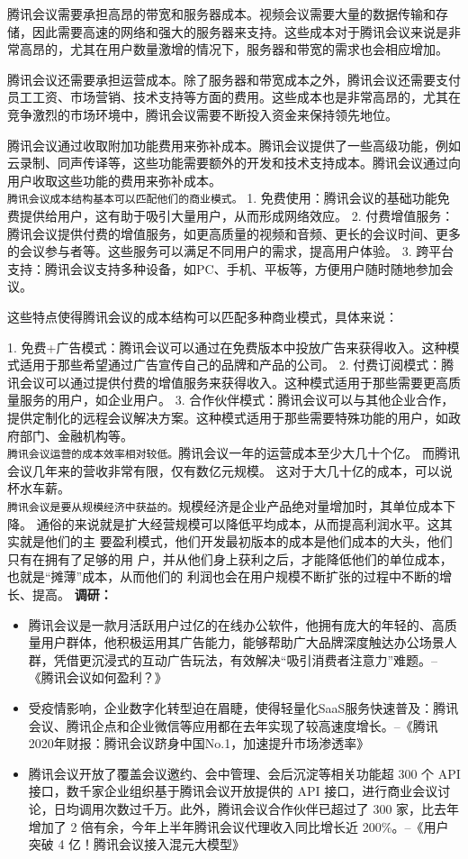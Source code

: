 \documentclass[a4paper,12pt]{article}
\begin{document}
腾讯会议需要承担高昂的带宽和服务器成本。视频会议需要大量的数据传输和存储，因此需要高速的网络和强大的服务器来支持。这些成本对于腾讯会议来说是非常高昂的，尤其在用户数量激增的情况下，服务器和带宽的需求也会相应增加。

腾讯会议还需要承担运营成本。除了服务器和带宽成本之外，腾讯会议还需要支付员工工资、市场营销、技术支持等方面的费用。这些成本也是非常高昂的，尤其在竞争激烈的市场环境中，腾讯会议需要不断投入资金来保持领先地位。

腾讯会议通过收取附加功能费用来弥补成本。腾讯会议提供了一些高级功能，例如云录制、同声传译等，这些功能需要额外的开发和技术支持成本。腾讯会议通过向用户收取这些功能的费用来弥补成本。
\\
\texttt{腾讯会议成本结构基本可以匹配他们的商业模式。}
1. 免费使用：腾讯会议的基础功能免费提供给用户，这有助于吸引大量用户，从而形成网络效应。
2. 付费增值服务：腾讯会议提供付费的增值服务，如更高质量的视频和音频、更长的会议时间、更多的会议参与者等。这些服务可以满足不同用户的需求，提高用户体验。
3. 跨平台支持：腾讯会议支持多种设备，如PC、手机、平板等，方便用户随时随地参加会议。

这些特点使得腾讯会议的成本结构可以匹配多种商业模式，具体来说：

1. 免费+广告模式：腾讯会议可以通过在免费版本中投放广告来获得收入。这种模式适用于那些希望通过广告宣传自己的品牌和产品的公司。
2. 付费订阅模式：腾讯会议可以通过提供付费的增值服务来获得收入。这种模式适用于那些需要更高质量服务的用户，如企业用户。
3. 合作伙伴模式：腾讯会议可以与其他企业合作，提供定制化的远程会议解决方案。这种模式适用于那些需要特殊功能的用户，如政府部门、金融机构等。
\\
\texttt{腾讯会议运营的成本效率相对较低。}腾讯会议一年的运营成本至少大几十个亿。 而腾讯会议几年来的营收非常有限，仅有数亿元规模。 这对于大几十亿的成本，可以说杯水车薪。\\
\texttt{腾讯会议是要从规模经济中获益的。}规模经济是企业产品绝对量增加时，其单位成本下降。
通俗的来说就是扩⼤经营规模可以降低平均成本，从⽽提⾼利润⽔平。这其实就是他们的主
要盈利模式，他们开发最初版本的成本是他们成本的⼤头，他们只有在拥有了⾜够的⽤
户，并从他们身上获利之后，才能降低他们的单位成本，也就是“摊薄”成本，从⽽他们的
利润也会在⽤户规模不断扩张的过程中不断的增⻓、提⾼。
\textbf{调研：}
\begin{itemize}
    \item 腾讯会议是一款月活跃用户过亿的在线办公软件，他拥有庞大的年轻的、高质量用户群体，他积极运用其广告能力，能够帮助广大品牌深度触达办公场景人群，凭借更沉浸式的互动广告玩法，有效解决“吸引消费者注意力”难题。--《腾讯会议如何盈利？》
    \item 受疫情影响，企业数字化转型迫在眉睫，使得轻量化SaaS服务快速普及：腾讯会议、腾讯企点和企业微信等应用都在去年实现了较高速度增长。--《腾讯2020年财报：腾讯会议跻身中国No.1，加速提升市场渗透率》
    \item 腾讯会议开放了覆盖会议邀约、会中管理、会后沉淀等相关功能超 300 个 API 接口，数千家企业组织基于腾讯会议开放提供的 API 接口，进行商业会议讨论，日均调用次数过千万。此外，腾讯会议合作伙伴已超过了 300 家，比去年增加了 2 倍有余，今年上半年腾讯会议代理收入同比增长近 200\%。--《用户突破 4 亿！腾讯会议接入混元大模型》
\end{itemize}
\end{document}
